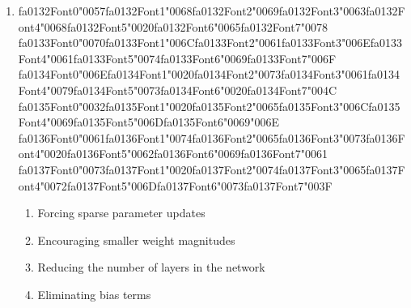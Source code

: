\documentclass[12pt]{article}
\begin{document}
\begin{enumerate}[label=Q\arabic*.]
 \item {\csname fa0132Font0\endcsname\char"0057}{\csname fa0132Font1\endcsname\char"0068}{\csname fa0132Font2\endcsname\char"0069}{\csname fa0132Font3\endcsname\char"0063}{\csname fa0132Font4\endcsname\char"0068}{\csname fa0132Font5\endcsname\char"0020}{\csname fa0132Font6\endcsname\char"0065}{\csname fa0132Font7\endcsname\char"0078} {\csname fa0133Font0\endcsname\char"0070}{\csname fa0133Font1\endcsname\char"006C}{\csname fa0133Font2\endcsname\char"0061}{\csname fa0133Font3\endcsname\char"006E}{\csname fa0133Font4\endcsname\char"0061}{\csname fa0133Font5\endcsname\char"0074}{\csname fa0133Font6\endcsname\char"0069}{\csname fa0133Font7\endcsname\char"006F} {\csname fa0134Font0\endcsname\char"006E}{\csname fa0134Font1\endcsname\char"0020}{\csname fa0134Font2\endcsname\char"0073}{\csname fa0134Font3\endcsname\char"0061}{\csname fa0134Font4\endcsname\char"0079}{\csname fa0134Font5\endcsname\char"0073}{\csname fa0134Font6\endcsname\char"0020}{\csname fa0134Font7\endcsname\char"004C} {\csname fa0135Font0\endcsname\char"0032}{\csname fa0135Font1\endcsname\char"0020}{\csname fa0135Font2\endcsname\char"0065}{\csname fa0135Font3\endcsname\char"006C}{\csname fa0135Font4\endcsname\char"0069}{\csname fa0135Font5\endcsname\char"006D}{\csname fa0135Font6\endcsname\char"0069}{\char"006E} {\csname fa0136Font0\endcsname\char"0061}{\csname fa0136Font1\endcsname\char"0074}{\csname fa0136Font2\endcsname\char"0065}{\csname fa0136Font3\endcsname\char"0073}{\csname fa0136Font4\endcsname\char"0020}{\csname fa0136Font5\endcsname\char"0062}{\csname fa0136Font6\endcsname\char"0069}{\csname fa0136Font7\endcsname\char"0061} {\csname fa0137Font0\endcsname\char"0073}{\csname fa0137Font1\endcsname\char"0020}{\csname fa0137Font2\endcsname\char"0074}{\csname fa0137Font3\endcsname\char"0065}{\csname fa0137Font4\endcsname\char"0072}{\csname fa0137Font5\endcsname\char"006D}{\csname fa0137Font6\endcsname\char"0073}{\csname fa0137Font7\endcsname\char"003F}
 \begin{enumerate}[label=(\Alph*)]
     \item Forcing sparse parameter updates
     \item Encouraging smaller weight magnitudes
     \item Reducing the number of layers in the network
     \item Eliminating bias terms
 \end{enumerate}
 

\end{enumerate}
\end{document}
